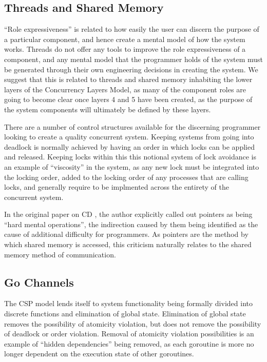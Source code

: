 \documentclass{sig-alternate}
\begin{document}
\subsection{Threads and Shared Memory}
``Role expressiveness'' is related to how easily the user can discern the purpose of a particular component, and hence create a mental model of how the system works. Threads do not offer any tools to improve the role expressiveness of a component, and any mental model that the programmer holds of the system must be generated through their own engineering decisions in creating the system. We suggest that this is related to threads and shared memory inhabiting the lower layers of the Concurrency Layers Model, as many of the component roles are going to become clear once layers 4 and 5 have been created, as the purpose of the system components will ultimately be defined by these layers.

There are a number of control structures available for the discerning programmer looking to create a quality concurrent system. Keeping systems from going into deadlock is normally achieved by having an order in which locks can be applied and released. Keeping locks within this this notional system of lock avoidance is an example of ``viscosity'' in the system, as any new lock must be integrated into the locking order, added to the locking order of any processes that are calling locks, and generally require to be implmented across the entirety of the concurrent system.

In the original paper on CD \cite{enpl}, the author explicitly called out pointers as being ``hard mental operations'', the indirection caused by them being identified as the cause of additional difficulty for programmers. As pointers are the method by which shared memory is accessed, this criticism naturally relates to the shared memory method of communication. 

\subsection{Go Channels}
The CSP model lends itself to system functionality being formally divided into discrete functions and elimination of global state. Elimination of global state removes the possibility of atomicity violation, but does not remove the possibility of deadlock or order violation. Removal of atomicity violation possibilities is an example of ``hidden dependencies'' being removed, as each goroutine is more no longer dependent on the execution state of other goroutines.
\end{document}
